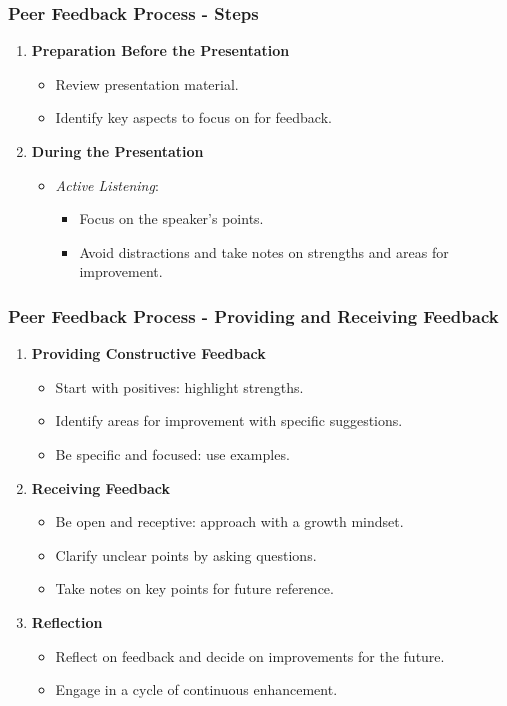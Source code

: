\documentclass[aspectratio=169]{beamer}
\begin{document}
\begin{frame}[fragile]
    \frametitle{Peer Feedback Process - Steps}
    \begin{enumerate}
        \item \textbf{Preparation Before the Presentation}
        \begin{itemize}
            \item Review presentation material.
            \item Identify key aspects to focus on for feedback.
        \end{itemize}
        
        \item \textbf{During the Presentation}
        \begin{itemize}
            \item \textit{Active Listening}:
            \begin{itemize}
                \item Focus on the speaker's points.
                \item Avoid distractions and take notes on strengths and areas for improvement.
            \end{itemize}
        \end{itemize}
    \end{enumerate}
\end{frame}

\begin{frame}[fragile]
    \frametitle{Peer Feedback Process - Providing and Receiving Feedback}
    \begin{enumerate}[resume]
        \item \textbf{Providing Constructive Feedback}
        \begin{itemize}
            \item Start with positives: highlight strengths.
            \item Identify areas for improvement with specific suggestions.
            \item Be specific and focused: use examples.
        \end{itemize}
        
        \item \textbf{Receiving Feedback}
        \begin{itemize}
            \item Be open and receptive: approach with a growth mindset.
            \item Clarify unclear points by asking questions.
            \item Take notes on key points for future reference.
        \end{itemize}
        
        \item \textbf{Reflection}
        \begin{itemize}
            \item Reflect on feedback and decide on improvements for the future.
            \item Engage in a cycle of continuous enhancement.
        \end{itemize}
    \end{enumerate}
\end{frame}
\end{document}
